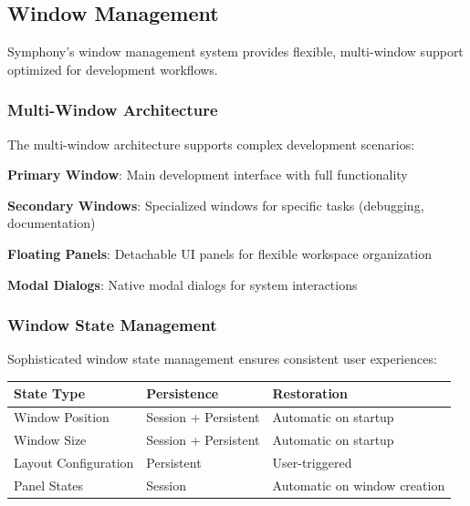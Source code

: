 \subsection*{Window Management}

Symphony's window management system provides flexible, multi-window support optimized for development workflows.

\subsubsection*{Multi-Window Architecture}

The multi-window architecture supports complex development scenarios:

\begin{compactlist}
    \item \textbf{Primary Window}: Main development interface with full functionality
    \item \textbf{Secondary Windows}: Specialized windows for specific tasks (debugging, documentation)
    \item \textbf{Floating Panels}: Detachable UI panels for flexible workspace organization
    \item \textbf{Modal Dialogs}: Native modal dialogs for system interactions
\end{compactlist}

\subsubsection*{Window State Management}

Sophisticated window state management ensures consistent user experiences:

\begin{center}
\begin{tabular}{@{}lll@{}}
\toprule
\textbf{State Type} & \textbf{Persistence} & \textbf{Restoration} \\
\midrule
Window Position & Session + Persistent & Automatic on startup \\
Window Size & Session + Persistent & Automatic on startup \\
Layout Configuration & Persistent & User-triggered \\
Panel States & Session & Automatic on window creation \\
\bottomrule
\end{tabular}
\end{center}

